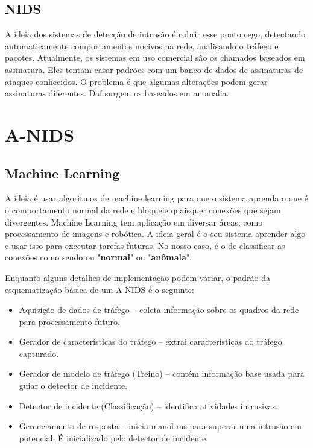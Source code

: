 \documentclass[12pt,a4paper]{article}
\begin{document}
    \subsection{NIDS}
    A ideia dos sistemas de detecção de intrusão é cobrir esse ponto cego, detectando automaticamente comportamentos
    nocivos na rede, analisando o tráfego e pacotes. Atualmente, os sistemas em uso comercial são os chamados
    baseados em assinatura. Eles tentam casar padrões com um banco de dados de assinaturas de ataques conhecidos.
    O problema é que algumas alterações podem gerar assinaturas diferentes. Daí surgem os baseados em anomalia.


\section{A-NIDS}
    \subsection{Machine Learning}
    A ideia é usar algoritmos de machine learning para que o sistema aprenda o que é o comportamento normal da rede e bloqueie quaisquer
    conexões que sejam divergentes. Machine Learning tem aplicação em diversar áreas, como processamento de imagens e robótica.
    A ideia geral é o seu sistema aprender algo e usar isso para executar tarefas futuras.
    No nosso caso, é o de classificar as conexões como sendo ou "\textbf{normal}" ou "\textbf{anômala}".

    Enquanto alguns detalhes de implementação podem variar, o padrão da esquematização básica de um A-NIDS
    é o seguinte:
    \begin{itemize}
        \item Aquisição de dados de tráfego -- coleta informação sobre os quadros da rede para processamento futuro.
        \item Gerador de características do tráfego -- extrai características do tráfego capturado.
        \item Gerador de modelo de tráfego (Treino) -- contém informação base usada para guiar o detector de incidente.
        \item Detector de incidente (Classificação) -- identifica atividades intrusivas.
        \item Gerenciamento de resposta -- inicia manobras para superar uma intrusão em potencial. É inicializado pelo
        detector de incidente.
    \end{itemize}
\end{document}
